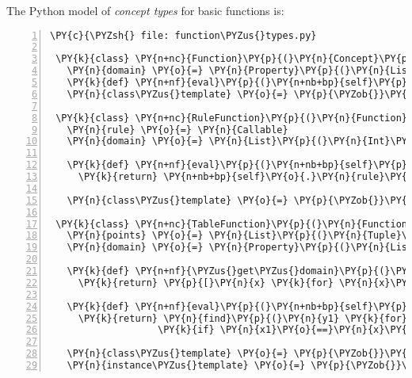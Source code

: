 \documentclass[letterpaper,compsoc,twoside]{IEEEtran}
\makeatletter
\def\PY@reset{\let\PY@it=\relax \let\PY@bf=\relax \let\PY@ul=\relax \let\PY@tc=\relax \let\PY@bc=\relax \let\PY@ff=\relax}
\def\PY@tok#1{\csname PY@tok@#1\endcsname}
\def\PY@toks#1+{\ifx\relax#1\empty\else \PY@tok{#1}\expandafter\PY@toks\fi}
\def\PY@do#1{\PY@bc{\PY@tc{\PY@ul{\PY@it{\PY@bf{\PY@ff{#1}}}}}}}
\def\PY#1#2{\PY@reset\PY@toks#1+\relax+\PY@do{#2}}
\def\PYZus{\char`\_}
\def\PYZob{\char`\{}
\def\PYZcb{\char`\}}
\def\PYZsh{\char`\#}
\def\PYZsq{\char`\'}
\makeatother
\begin{document}
The Python model of \emph{concept types} for basic functions is:
\begin{Verbatim}[commandchars=\\\{\},numbers=left,firstnumber=1,stepnumber=1,fontsize=\footnotesize,xleftmargin=2.25mm,numbersep=3pt]
 \PY{c}{\PYZsh{} file: function\PYZus{}types.py}

 \PY{k}{class} \PY{n+nc}{Function}\PY{p}{(}\PY{n}{Concept}\PY{p}{)}\PY{p}{:}
   \PY{n}{domain} \PY{o}{=} \PY{n}{Property}\PY{p}{(}\PY{n}{List}\PY{p}{(}\PY{n}{Int}\PY{p}{)}\PY{p}{)}
   \PY{k}{def} \PY{n+nf}{eval}\PY{p}{(}\PY{n+nb+bp}{self}\PY{p}{,} \PY{n}{x}\PY{p}{)}\PY{p}{:} \PY{k}{pass}
   \PY{n}{class\PYZus{}template} \PY{o}{=} \PY{p}{\PYZob{}}\PY{n}{K}\PY{o}{.}\PY{n}{gradient\PYZus{}color}\PY{p}{:} \PY{l+s}{\PYZsq{}}\PY{l+s}{Green}\PY{l+s}{\PYZsq{}}\PY{p}{\PYZcb{}}

 \PY{k}{class} \PY{n+nc}{RuleFunction}\PY{p}{(}\PY{n}{Function}\PY{p}{)}\PY{p}{:}
   \PY{n}{rule} \PY{o}{=} \PY{n}{Callable}
   \PY{n}{domain} \PY{o}{=} \PY{n}{List}\PY{p}{(}\PY{n}{Int}\PY{p}{)}

   \PY{k}{def} \PY{n+nf}{eval}\PY{p}{(}\PY{n+nb+bp}{self}\PY{p}{,} \PY{n}{x}\PY{p}{)}\PY{p}{:}
     \PY{k}{return} \PY{n+nb+bp}{self}\PY{o}{.}\PY{n}{rule}\PY{p}{(}\PY{n}{x}\PY{p}{)}

   \PY{n}{class\PYZus{}template} \PY{o}{=} \PY{p}{\PYZob{}}\PY{n}{K}\PY{o}{.}\PY{n}{gradient\PYZus{}color}\PY{p}{:} \PY{l+s}{\PYZsq{}}\PY{l+s}{Yellow}\PY{l+s}{\PYZsq{}}\PY{p}{\PYZcb{}}

 \PY{k}{class} \PY{n+nc}{TableFunction}\PY{p}{(}\PY{n}{Function}\PY{p}{)}\PY{p}{:}
   \PY{n}{points} \PY{o}{=} \PY{n}{List}\PY{p}{(}\PY{n}{Tuple}\PY{p}{(}\PY{n}{Int}\PY{p}{,} \PY{n}{Int}\PY{p}{)}\PY{p}{)}
   \PY{n}{domain} \PY{o}{=} \PY{n}{Property}\PY{p}{(}\PY{n}{List}\PY{p}{(}\PY{n}{Int}\PY{p}{)}\PY{p}{)}

   \PY{k}{def} \PY{n+nf}{\PYZus{}get\PYZus{}domain}\PY{p}{(}\PY{n+nb+bp}{self}\PY{p}{)}\PY{p}{:}
     \PY{k}{return} \PY{p}{[}\PY{n}{x} \PY{k}{for} \PY{n}{x}\PY{p}{,} \PY{n}{y} \PY{o+ow}{in} \PY{n+nb+bp}{self}\PY{o}{.}\PY{n}{points}\PY{p}{]}

   \PY{k}{def} \PY{n+nf}{eval}\PY{p}{(}\PY{n+nb+bp}{self}\PY{p}{,} \PY{n}{x}\PY{p}{)}\PY{p}{:}
     \PY{k}{return} \PY{n}{find}\PY{p}{(}\PY{n}{y1} \PY{k}{for} \PY{n}{x1}\PY{p}{,}\PY{n}{y1} \PY{o+ow}{in} \PY{n+nb+bp}{self}\PY{o}{.}\PY{n}{points}
                   \PY{k}{if} \PY{n}{x1}\PY{o}{==}\PY{n}{x}\PY{p}{)}

   \PY{n}{class\PYZus{}template} \PY{o}{=} \PY{p}{\PYZob{}}\PY{n}{K}\PY{o}{.}\PY{n}{gradient\PYZus{}color}\PY{p}{:} \PY{l+s}{\PYZsq{}}\PY{l+s}{Maroon}\PY{l+s}{\PYZsq{}}\PY{p}{\PYZcb{}}
   \PY{n}{instance\PYZus{}template} \PY{o}{=} \PY{p}{\PYZob{}}\PY{n}{K}\PY{o}{.}\PY{n}{name}\PY{p}{:} \PY{l+s}{\PYZsq{}}\PY{l+s}{Circle}\PY{l+s}{\PYZsq{}}\PY{p}{\PYZcb{}}
\end{Verbatim}
\end{document}
